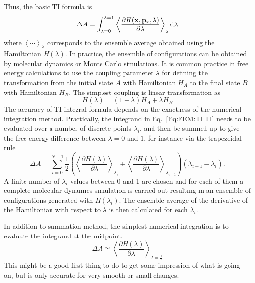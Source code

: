 Thus, the basic TI formula is
\begin{equation}
\Delta A = \int_{\lambda=0}^{\lambda=1}\left \langle \frac{\partial{H(\mathbf{x},\mathbf{p}_{x},\lambda)}}{\partial{\lambda}} \right \rangle_{\lambda} \mathop{}\!\mathrm{d}\lambda
\label{Eq:FEM:TI:TI}
\end{equation} 
where $\left \langle \cdots \right \rangle _{\lambda}$ corresponds to the ensemble average obtained using the Hamiltonian $H(\lambda)$. In practice, the ensemble of configurations can be obtained by molecular dynamics or Monte Carlo simulations. It is common practice in free energy calculations to use the coupling parameter $\lambda$ for defining the transformation from the initial state $A$ with Hamiltonian $H_{A}$ to the final state $B$ with Hamiltonian $H_{B}$. The simplest coupling is linear transformation as
\begin{equation}
H(\lambda) = (1-\lambda) H_{A} + \lambda H_{B}
\end{equation}
The accuracy of TI integral formula depends on the exactness of the numerical integration method.\cite{PaliwalJCTC2011} Practically, the integrand in Eq.~\ref{Eq:FEM:TI:TI} needs to be evaluated over a number of discrete points $\lambda_{i}$, and then be summed up to give the free energy difference between $\lambda=0$ and $1$, for instance via the trapezoidal rule
\begin{equation}
\Delta A = \sum_{i=0}^{N-1}\frac{1}{2}\left(\left \langle \frac{\partial{H(\lambda)}}{\partial{\lambda}} \right \rangle_{\lambda_{i}} + \left \langle\frac{\partial{H(\lambda)}}{\partial{\lambda}} \right \rangle_{\lambda_{i+1}}\right)
(\lambda_{i+1}-\lambda_i).
\label{Eq:FEM:TI:dTI}
\end{equation} 
A finite number of $\lambda_{i}$ values between 0 and 1 are chosen and for each of them a complete molecular dynamics simulation is carried out resulting in an ensemble of configurations generated with $H(\lambda_{i})$.
The ensemble average of the derivative of the Hamiltonian with respect to $\lambda$ is then calculated for each $\lambda_{i}$.
	
In addition to summation method, the simplest numerical integration is to evaluate the integrand at the midpoint:
\begin{equation}
\Delta A \simeq \left \langle \frac{\partial{H(\lambda)}}{\partial{\lambda}} \right \rangle_{\lambda=\frac{1}{2}}
\label{Eq:FEM:TI:TI1}
\end{equation} 
This might be a good first thing to do to get some impression of what is going on, but is only accurate for very smooth or small changes. %
	
